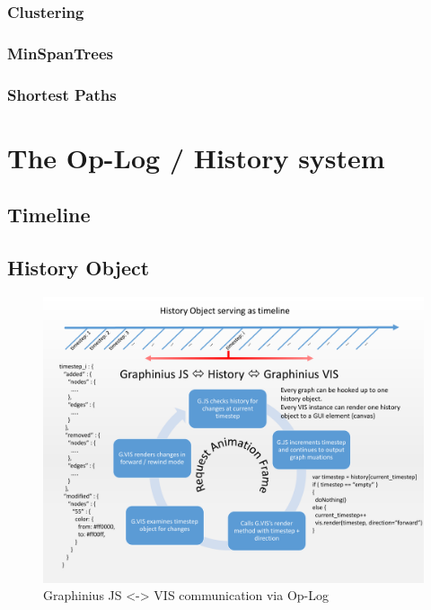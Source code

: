 		\subsubsection{Clustering}
		\label{sssection: algo_clustering}
		
		\subsubsection{MinSpanTrees}
		\label{sssection: algo_minspan}
		
		\subsubsection{Shortest Paths}
		\label{sssection: algo_shorest_paths}


\section{The Op-Log / History system}
\label{sect:op_log}

	\subsection{Timeline}
	\label{ssect:timeline}
	
	\subsection{History Object}
	\label{ssect:history_object}
	
		
	
	\begin{landscape}
		\begin{figure}[ht]
			\label{fig_history_workflow}
			\centering
			\vspace{-2.0cm}
			\includegraphics[width=1.6\textwidth]{figures/History_Workflow_pdf}
			\caption{Graphinius JS <-> VIS communication via Op-Log}
		\end{figure}
	\end{landscape}

